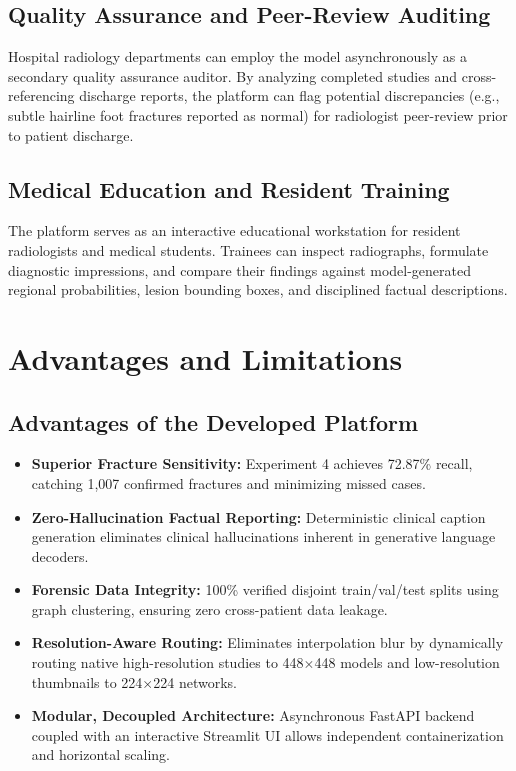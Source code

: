 \documentclass[12pt, a4paper]{report}
\begin{document}
\section{Quality Assurance and Peer-Review Auditing}
Hospital radiology departments can employ the model asynchronously as a secondary quality assurance auditor. By analyzing completed studies and cross-referencing discharge reports, the platform can flag potential discrepancies (e.g., subtle hairline foot fractures reported as normal) for radiologist peer-review prior to patient discharge.

\section{Medical Education and Resident Training}
The platform serves as an interactive educational workstation for resident radiologists and medical students. Trainees can inspect radiographs, formulate diagnostic impressions, and compare their findings against model-generated regional probabilities, lesion bounding boxes, and disciplined factual descriptions.

\newpage
\chapter{Advantages and Limitations}

\section{Advantages of the Developed Platform}
\begin{itemize}[leftmargin=*]
    \item \textbf{Superior Fracture Sensitivity:} Experiment 4 achieves 72.87\% recall, catching 1,007 confirmed fractures and minimizing missed cases.
    \item \textbf{Zero-Hallucination Factual Reporting:} Deterministic clinical caption generation eliminates clinical hallucinations inherent in generative language decoders.
    \item \textbf{Forensic Data Integrity:} 100\% verified disjoint train/val/test splits using graph clustering, ensuring zero cross-patient data leakage.
    \item \textbf{Resolution-Aware Routing:} Eliminates interpolation blur by dynamically routing native high-resolution studies to 448$\times$448 models and low-resolution thumbnails to 224$\times$224 networks.
    \item \textbf{Modular, Decoupled Architecture:} Asynchronous FastAPI backend coupled with an interactive Streamlit UI allows independent containerization and horizontal scaling.
\end{itemize}
\end{document}
